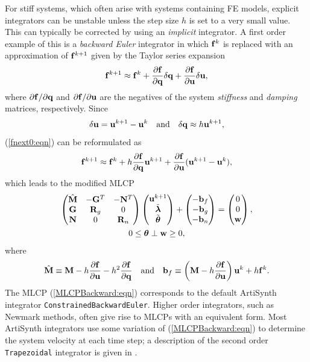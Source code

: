 For stiff systems, which often arise with systems containing FE models,
explicit integrators can be unstable unless the step size $h$ is set to a very
small value. This can typically be corrected by using an {\it implicit}
integrator. A first order example of this is a {\it backward Euler} integrator
in which ${\bf f}^{k}$ is replaced with an approximation of ${\bf f}^{k+1}$ given by the
Taylor series expansion
%
\begin{equation}
{\bf f}^{k+1} \approx {\bf f}^{k} + \frac{\partial {\bf f}}{\partial {\bf q}} \delta{\bf q}
+ \frac{\partial {\bf f}}{\partial {\bf u}} \delta{\bf u},
\label{fnext0:eqn}
\end{equation}
%
where ${\partial {\bf f}}/{\partial {\bf q}}$ and ${\partial {\bf f}}/{\partial {\bf u}}$ are the
negatives of the system {\it stiffness} and {\it damping} matrices,
respectively. Since
%
\begin{equation*}
\delta{\bf u} = {\bf u}^{k+1} - {\bf u}^k \quad \text{and} \quad
\delta{\bf q} \approx h {\bf u}^{k+1},
\end{equation*}
%
(\ref{fnext0:eqn}) can be reformulated as
%
\begin{equation}
{\bf f}^{k+1} \approx {\bf f}^{k} + h \frac{\partial {\bf f}}{\partial {\bf q}} {\bf u}^{k+1}
+ \frac{\partial {\bf f}}{\partial {\bf u}} ({\bf u}^{k+1} - {\bf u}^k),
\label{fnext1:eqn}
\end{equation}
%
which leads to the modified MLCP
\begin{gather}
\left(
\begin{matrix}
\hat{{\bf M}} & -{\bf G}^{T} & -{\bf N}^{T} \\
{\bf G} & {\bf R}_g & 0 \\
{\bf N} & 0 & {\bf R}_n 
\end{matrix}
\right)
\left(
\begin{matrix}
{\bf u}^{k+1} \\
\tilde{\boldsymbol\lambda} \\
\tilde{\boldsymbol\theta}
\end{matrix}
\right)
+
\left(
\begin{matrix}
-{\bf b}_f \\
-{\bf b}_g \\
-{\bf b}_n
\end{matrix}
\right)
=
\left(
\begin{matrix}
0 \\
0 \\
{\bf w}
\end{matrix}
\right), \notag \\
0 \le \boldsymbol\theta \perp {\bf w} \ge 0,
\label{MLCPBackward:eqn}
\end{gather}
where
%
\begin{equation*}
\hat{{\bf M}} \equiv {\bf M} - h \frac{\partial {\bf f}}{\partial {\bf u}} - h^2 
\frac{\partial {\bf f}}{\partial {\bf q}}
\quad\text{and}\quad
{\bf b}_f \equiv \left( {\bf M} - h  \frac{\partial {\bf f}}{\partial {\bf u}} \right) {\bf u}^{k} + 
h {\bf f}^{k}.
\end{equation*}
%
The MLCP (\ref{MLCPBackward:eqn}) corresponds to the default ArtiSynth integrator
{\tt ConstrainedBackwardEuler}. Higher order integrators, such as Newmark
methods, often give rise to MLCPs with an equivalent form.  Most
ArtiSynth integrators use some variation of (\ref{MLCPBackward:eqn}) to
determine the system velocity at each time step; a description
of the second order {\tt Trapezoidal} integrator is given in
\cite{lloyd2012artisynth}.

